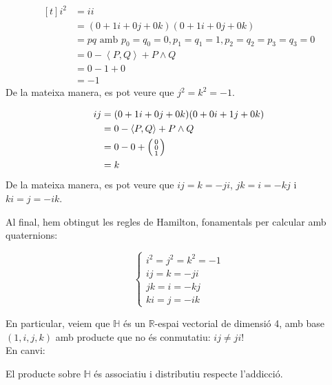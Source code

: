 \documentclass[a4paper,12pt]{article}
\begin{document}
	\begin{obs}
		\begin{displaymath}
			\begin{aligned}[t]
				i^2 &= ii\\
					&= (0 + 1i + 0j + 0k) (0 + 1i + 0j + 0k)\\
					&= pq \text{ amb } p_0 = q_0 = 0, p_1 = q_1 = 1, p_2 = q_2 = p_3 = q_3 = 0\\
					&= 0 - \left\langle P, Q\right\rangle + P \wedge Q\\
					&= 0 - 1 + 0\\
					&= -1
			\end{aligned}
		\end{displaymath}
		De la mateixa manera, es pot veure que $j^2 = k^2 = -1$.
	\end{obs}

	\begin{obs}
		\begin{displaymath}
			\begin{aligned}[t]
				ij &= (0 + 1i + 0j + 0k)(0 + 0i + 1j + 0k)\\
				   &= 0 - \left\langle P, Q\right\rangle + P \wedge Q\\
				   &= 0 - 0 + \begin{psmallmatrix}
							0\\0\\1
							\end{psmallmatrix}\\
				   &= k
			\end{aligned}
		\end{displaymath}
		De la mateixa manera, es pot veure que $ij = k = -ji$, $jk = i = -kj$ i $ki = j = -ik$.
	\end{obs}

	Al final, hem obtingut les regles de Hamilton, fonamentals per calcular amb quaternions:

	\begin{displaymath}
		\begin{cases}
			i^2 = j^2 = k^2 = -1\\
			ij = k = -ji\\
			jk = i = -kj\\
			ki = j = -ik
		\end{cases}
	\end{displaymath}

	En particular, veiem que $\mathbb{H}$ és un $\mathbb{R}$-espai vectorial de dimensió 4, amb base $(1, i, j, k)$ amb producte que no és conmutatiu: $ij \neq ji$!\\
	En canvi:
	\begin{proposicio}
		El producte sobre $\mathbb{H}$ és associatiu i distributiu respecte l'addicció.
	\end{proposicio}
\end{document}
